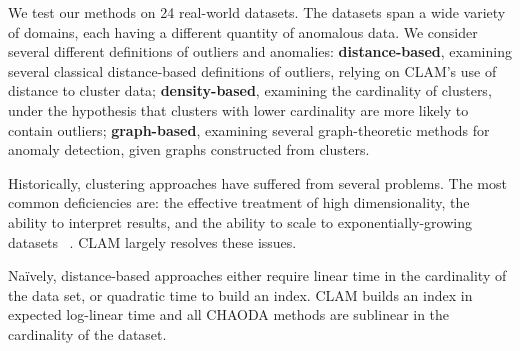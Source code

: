 We test our methods on 24 real-world datasets.
The datasets span a wide variety of domains, each having a different quantity of anomalous data.
We consider several different definitions of outliers and anomalies: \textbf{distance-based}, examining several classical distance-based definitions of outliers, relying on CLAM's use of distance to cluster data; \textbf{density-based}, examining the cardinality of clusters, under the hypothesis that clusters with lower cardinality are more likely to contain outliers; \textbf{graph-based}, examining several graph-theoretic methods for anomaly detection, given graphs constructed from clusters.

Historically, clustering approaches have suffered from several problems.
The most common deficiencies are: the effective treatment of high dimensionality, the ability to interpret results, and the ability to scale to exponentially-growing datasets ~\cite{agrawal1998automatic}.
CLAM largely resolves these issues.

Na\"ively, distance-based approaches either require linear time in the cardinality of the data set, or quadratic time to build an index. 
CLAM builds an index in expected log-linear time and all CHAODA methods are sublinear in the cardinality of the dataset.

